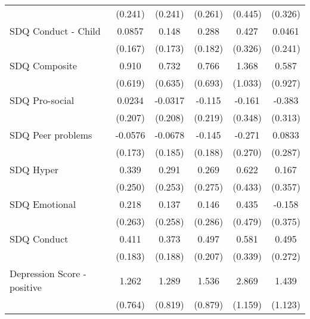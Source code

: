 {\begin{tabular}{l*{5}{c}}
            &     (0.241)         &     (0.241)         &     (0.261)         &     (0.445)         &     (0.326)         \\
\addlinespace
SDQ Conduct - Child&      0.0857         &       0.148         &       0.288         &       0.427         &      0.0461         \\
            &     (0.167)         &     (0.173)         &     (0.182)         &     (0.326)         &     (0.241)         \\
\addlinespace
SDQ Composite&       0.910         &       0.732         &       0.766         &       1.368         &       0.587         \\
            &     (0.619)         &     (0.635)         &     (0.693)         &     (1.033)         &     (0.927)         \\
\addlinespace
SDQ Pro-social&      0.0234         &     -0.0317         &      -0.115         &      -0.161         &      -0.383         \\
            &     (0.207)         &     (0.208)         &     (0.219)         &     (0.348)         &     (0.313)         \\
\addlinespace
SDQ Peer problems&     -0.0576         &     -0.0678         &      -0.145         &      -0.271         &      0.0833         \\
            &     (0.173)         &     (0.185)         &     (0.188)         &     (0.270)         &     (0.287)         \\
\addlinespace
SDQ Hyper   &       0.339         &       0.291         &       0.269         &       0.622         &       0.167         \\
            &     (0.250)         &     (0.253)         &     (0.275)         &     (0.433)         &     (0.357)         \\
\addlinespace
SDQ Emotional&       0.218         &       0.137         &       0.146         &       0.435         &      -0.158         \\
            &     (0.263)         &     (0.258)         &     (0.286)         &     (0.479)         &     (0.375)         \\
\addlinespace
SDQ Conduct &       0.411\sym{*}  &       0.373\sym{*}  &       0.497\sym{*}  &       0.581         &       0.495         \\
            &     (0.183)         &     (0.188)         &     (0.207)         &     (0.339)         &     (0.272)         \\
\addlinespace
Depression Score - positive&       1.262         &       1.289         &       1.536         &       2.869\sym{*}  &       1.439         \\
            &     (0.764)         &     (0.819)         &     (0.879)         &     (1.159)         &     (1.123)         \\
\bottomrule
\end{tabular}
}
